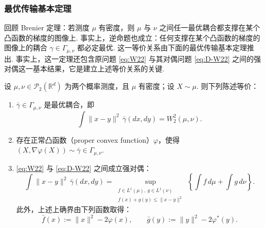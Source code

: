 \subsubsection{最优传输基本定理}\label{sec:1.5.3}

回顾 Brenier 定理：若测度 $\mu$ 有密度，则 $\mu$ 与 $\nu$ 之间任一最优耦合都支撑在某个凸函数的梯度的图像上. 事实上，逆命题也成立：任何支撑在某个凸函数的梯度的图像上的耦合 $\gamma\in\Gamma_{\mu,\nu}$ 都必定最优. 这一等价关系由下面的最优传输基本定理推出. 事实上，这一定理还包含原问题 \eqref{eq:W22} 与其对偶问题 \eqref{eq:D-W22} 之间的强对偶这一基本结果，它是建立上述等价关系的关键.

\begin{theorem}[最优传输基本定理]\label{thm:1.14}
设 $\mu,\nu\in\mathcal{P}_2(\mathbb{R}^d)$ 为两个概率测度，且 $\mu$ 有密度；设 $X\sim\mu$. 则下列陈述等价：
\begin{enumerate}
\renewcommand{\labelenumi}{(\roman{enumi})}
\item\label{item:1.14.i} $\bar\gamma\in\Gamma_{\mu,\nu}$ 是最优耦合，即
$$
\int\|x-y\|^2\,\bar\gamma(dx,dy)=W_2^2(\mu,\nu).
$$
\item\label{item:1.14.ii} 存在正常凸函数（proper convex function）$\varphi$，使得 $(X,\nabla\varphi(X))\sim\bar\gamma\in\Gamma_{\mu,\nu}$.
\item\label{item:1.14.iii} \eqref{eq:W22} 与 \eqref{eq:D-W22} 之间成立强对偶：
$$
\int\|x-y\|^2\,\bar\gamma(dx,dy)
=\sup_{\substack{f\in L^1(\mu),\ g\in L^1(\nu)\\
f(x)+g(y)\leq\|x-y\|^2}}
\left\{\int f\,d\mu+\int g\,d\nu\right\}.
$$
此外，上述上确界由下列函数取得：
$$
\bar f(x):=\|x\|^2-2\varphi(x),\qquad
\bar g(y):=\|y\|^2-2\varphi^*(y).
$$
\end{enumerate}
\end{theorem}
